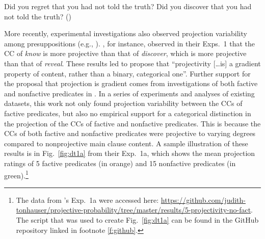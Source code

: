 \documentclass[11pt,fleqn]{article}
\newcommand{\6}{\mbox{$[\hspace*{-.6mm}[$}}
\newcommand{\9}{\mbox{$]\hspace*{-.6mm}]$}}
\newcommand{\citepos}[1]{\citeauthor{#1}'s \citeyear{#1}}
\begin{document}
\begin{exe}
\ex\label{kart}
\begin{xlist}
\ex Did you regret that you had not told the truth?
\ex Did you discover that you had not told the truth? \hfill (\citealt[63]{karttunen71b})
\end{xlist}
\end{exe}
More recently, experimental investigations also observed projection variability among presuppositions (e.g., \citealt*{xue-onea11,demarneffe-etal-sub23,tbd-variability,degen-tonhauser-language}). \citealt{tbd-variability}, for instance, observed in their Exps.~1 that the CC of {\em know} is more projective than that of {\em discover}, which is more projective than that of {\em reveal}. These results led \citealt[498]{tbd-variability} to propose that ``projectivity [\ldots is] a gradient property of content, rather than a binary, categorical one''. Further support for the proposal that projection is gradient comes from  investigations of both factive and nonfactive predicates in \citealt{degen-tonhauser-language}. In a series of experiments and analyses of existing datasets, this work not only found projection variability between the CCs of factive predicates, but also no empirical support for a categorical distinction in the projection of the CCs of factive and nonfactive predicates. This is because the CCs of both factive and nonfactive predicates were projective to varying degrees compared to nonprojective main clause content. A sample illustration of these results is in Fig.~\ref{fig:dt1a} from their Exp.~1a, which shows the mean projection ratings of 5 factive predicates (in \color{orange}orange\color{black}) and 15 nonfactive predicates (in \color{green}green\color{black}).\footnote{The data from \citepos{degen-tonhauser-language} Exp.~1a were accessed here: \url{https://github.com/judith-tonhauser/projective-probability/tree/master/results/5-projectivity-no-fact}. The script that was used to create Fig.~\ref{fig:dt1a} can be found in the GitHub repository linked in footnote \ref{f:github}.}
\end{document}
